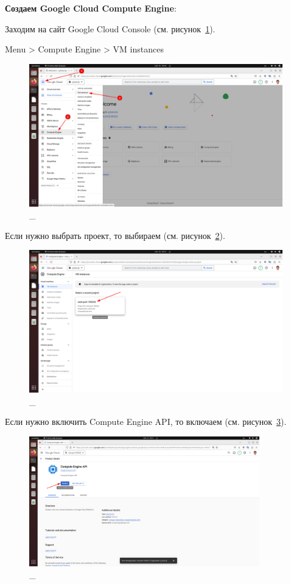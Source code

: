 \documentclass[12pt, a4paper, simple]{eskdtext}
\begin{document}
  \newpage
  \textbf{Создаем Google Cloud Compute Engine}:

  Заходим на сайт Google Cloud Console \cite{GoogleCloudConsole} (см. рисунок~\ref{fig:3}).
  
  Menu > Compute Engine > VM instances

  \begin{figure}[!h]
    \centering
    \includegraphics[width=11cm]
    {images/2023-02-25_20-50-57.png}
    \caption{\_}
    \label{fig:3}
  \end{figure}

  Если нужно выбрать проект, то выбираем (см. рисунок~\ref{fig:4}).

  \begin{figure}[!h]
    \centering
    \includegraphics[width=11cm]
    {images/2023-02-25_20-51-20.png}
    \caption{\_}
    \label{fig:4}
  \end{figure}

  Если нужно включить Compute Engine API, то включаем (см. рисунок~\ref{fig:5}).

  \begin{figure}[!h]
    \centering
    \includegraphics[width=10cm]
    {images/2023-02-25_20-51-41.png}
    \caption{\_}
    \label{fig:5}
  \end{figure}
\end{document}

